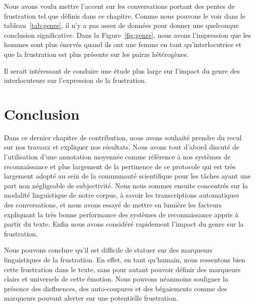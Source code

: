 

Nous avons voulu mettre l'accent sur les conversations portant des pentes de frustration tel que définis dans ce chapitre. Comme nous pouvons le voir dans le tableau~\ref{tab:genre}, il n'y a pas assez de données pour donner une quelconque conclusion significative. Dans la Figure~\ref{fig:genre}, nous avons l'impression que les hommes sont plus énervés quand ils ont une femme en tant qu'interlocutrice et que la frustration est plus présente sur les pairzs hétérogènes.



 Il serait intéressant de conduire une étude plus large sur l'impact du genre des interlocuteurs sur l'expression de la frustration.

\section{Conclusion}
Dans ce dernier chapitre de contribution, nous avons souhaité prendre du recul sur nos travaux et expliquer nos résultats. Nous avons tout d'abord discuté de l'utilisation d'une annotation moyennée comme référence à nos systèmes de reconnaissance et plus largement de la pertinence de ce protocole qui est très largement adopté au sein de la communauté scientifique pour les tâches ayant une part non négligeable de subjectivité. Nous nous sommes ensuite concentrés sur la modalité linguistique de notre corpus, à savoir les transcriptions automatiques des conversations, et nous avons essayé de mettre en lumière les facteurs expliquant la très bonne performance des systèmes de reconnaissance appris à partir du texte. Enfin nous avons considéré rapidement l'impact du genre sur la frustration.

Nous pouvons conclure qu'il est difficile de statuer sur des marqueurs linguistiques de la frustration. En effet, en tant qu'humain, nous ressentons bien cette frustration dans le texte, sans pour autant pouvoir définir des marqueurs clairs et universels de cette émotion. Nous pouvons néanmoins souligner la présence des disfluences, des auto-coupures et des bégaiements comme des marqueurs pouvant alerter sur une potentielle frustration.
